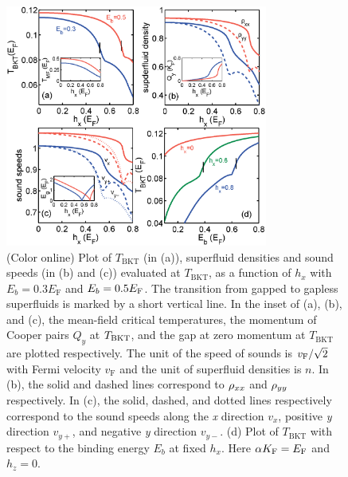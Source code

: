 \documentclass[prl,aps,twocolumn,showpacs, floatfix]{revtex4}
\begin{document}
\begin{figure}[t]
\includegraphics[width=3.4in]{T_hx.eps}
\caption{(Color online) Plot of $T_{\mathrm{BKT}}$ (in (a)), superfluid
densities and sound speeds (in (b) and (c)) evaluated at $T_{\mathrm{BKT}}$,
as a function of $h_{x} $ with $E_{b}=0.3E_{\mathrm{F}}$ and $E_{b}=0.5E_{%
\mathrm{F}}$. The transition from gapped to gapless superfluids is marked by
a short vertical line. In the inset of (a), (b), and (c), the mean-field
critical temperatures, the momentum of Cooper pairs $Q_{y}$ at $T_{\mathrm{%
BKT}}$, and the gap at zero momentum at $T_{\mathrm{BKT}}$ are plotted
respectively. The unit of the speed of sounds is $v_{\mathrm{F}}/\protect%
\sqrt{2}$ with Fermi velocity $v_{\mathrm{F}}$ and the unit of superfluid
densities is $n$. In (b), the solid and dashed lines correspond to $\protect%
\rho _{xx}$ and $\protect\rho _{yy}$ respectively. In (c), the solid,
dashed, and dotted lines respectively correspond to the sound speeds along
the \textit{x} direction $v_{x}$, positive \textit{y} direction $v_{y+} $,
and negative \textit{y} direction $v_{y-}$. (d) Plot of $T_{\mathrm{BKT}}$
with respect to the binding energy $E_{b}$ at fixed $h_{x}$. Here $\protect%
\alpha K_{\mathrm{F}}=E_{\mathrm{F}}$ and $h_{z}=0$.}
\label{Gapless_FF}
\end{figure}
\end{document}

